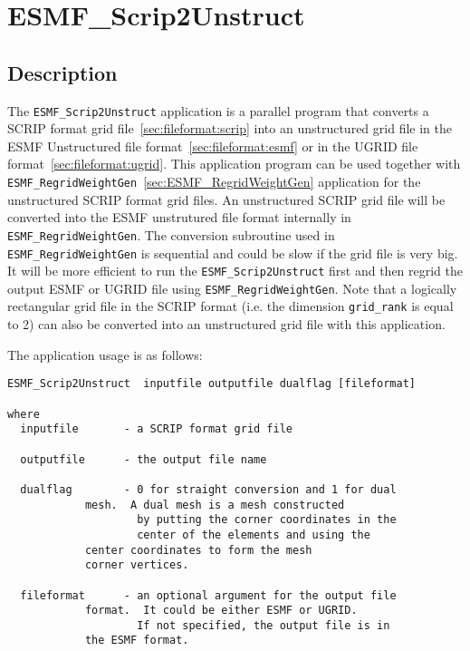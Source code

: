 
\section{ESMF\_Scrip2Unstruct}
\label{sec:ESMF_Scrip2Unstruct}

\subsection{Description}

The {\tt ESMF\_Scrip2Unstruct} application is a parallel program that converts a SCRIP format grid file~\ref{sec:fileformat:scrip} into an unstructured grid file in the ESMF Unstructured file format~\ref{sec:fileformat:esmf} or in the UGRID file format~\ref{sec:fileformat:ugrid}. This application program can be used together with {\tt ESMF\_RegridWeightGen}~\ref{sec:ESMF_RegridWeightGen} application for the unstructured SCRIP format grid files.  An unstructured SCRIP grid file will be converted into the ESMF unstrutured file format internally in {\tt ESMF\_RegridWeightGen}.  The conversion subroutine used in {\tt ESMF\_RegridWeightGen} is sequential and could be slow if the grid file is very big.  It will be more efficient to run the {\tt ESMF\_Scrip2Unstruct} first and then regrid the output ESMF or UGRID file using {\tt ESMF\_RegridWeightGen}.  Note that a logically rectangular grid file in the SCRIP format (i.e. the dimension {\tt grid\_rank} is equal to 2) can also be converted into an unstructured grid file with this application.   

The application usage is as follows:

\begin{verbatim}
ESMF_Scrip2Unstruct  inputfile outputfile dualflag [fileformat]

where
  inputfile       - a SCRIP format grid file

  outputfile      - the output file name
 
  dualflag        - 0 for straight conversion and 1 for dual 
		    mesh.  A dual mesh is a mesh constructed 
                    by putting the corner coordinates in the 
                    center of the elements and using the 
		    center coordinates to form the mesh 
		    corner vertices.

  fileformat      - an optional argument for the output file 
		    format.  It could be either ESMF or UGRID.
                    If not specified, the output file is in 
		    the ESMF format.  
  
\end{verbatim}
